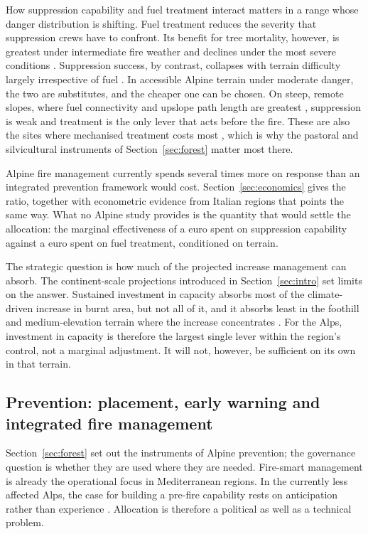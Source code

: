\documentclass[11pt,a4paper]{article}
\begin{document}
How suppression capability and fuel treatment interact matters in a range whose danger distribution is shifting. Fuel treatment reduces the severity that suppression crews have to confront. Its benefit for tree mortality, however, is greatest under intermediate fire weather and declines under the most severe conditions \citep{brodie_forest_2024}. Suppression success, by contrast, collapses with terrain difficulty largely irrespective of fuel \citep{cardil_assessing_2025}. In accessible Alpine terrain under moderate danger, the two are substitutes, and the cheaper one can be chosen. On steep, remote slopes, where fuel connectivity and upslope path length are greatest \citep{conedera_linking_2024}, suppression is weak and treatment is the only lever that acts before the fire. These are also the sites where mechanised treatment costs most \citep{dinca_timber_2025}, which is why the pastoral and silvicultural instruments of Section~\ref{sec:forest} matter most there.

Alpine fire management currently spends several times more on response than an integrated prevention framework would cost. Section~\ref{sec:economics} gives the ratio, together with econometric evidence from Italian regions that points the same way. What no Alpine study provides is the quantity that would settle the allocation: the marginal effectiveness of a euro spent on suppression capability against a euro spent on fuel treatment, conditioned on terrain.

The strategic question is how much of the projected increase management can absorb. The continent-scale projections introduced in Section~\ref{sec:intro} set limits on the answer. Sustained investment in capacity absorbs most of the climate-driven increase in burnt area, but not all of it, and it absorbs least in the foothill and medium-elevation terrain where the increase concentrates \citep{billing_future_2026}. For the Alps, investment in capacity is therefore the largest single lever within the region's control, not a marginal adjustment. It will not, however, be sufficient on its own in that terrain.

\subsection{Prevention: placement, early warning and integrated fire management}

Section~\ref{sec:forest} set out the instruments of Alpine prevention; the governance question is whether they are used where they are needed. Fire-smart management is already the operational focus in Mediterranean regions. In the currently less affected Alps, the case for building a pre-fire capability rests on anticipation rather than experience \citep{gerberding_mapping_2025}. Allocation is therefore a political as well as a technical problem.
\end{document}
